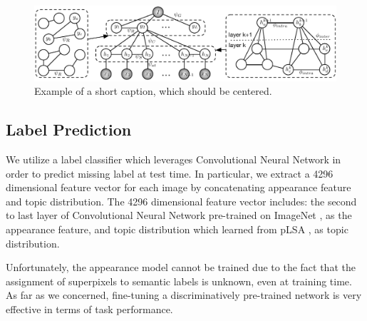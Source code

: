 \begin{figure}
    \begin{center}
        \includegraphics[width=0.95\linewidth]{graphmodel.pdf}
    \end{center}
    \caption{Example of a short caption, which should be centered.}
    \label{fig:graphmodel}
\end{figure}

\subsection{Label Prediction}
We utilize a label classifier which leverages Convolutional Neural Network in order to predict missing label at test time. In particular, we extract a 4296 dimensional feature vector for each image by concatenating appearance feature and topic distribution. The 4296 dimensional feature vector includes: the second to last layer of Convolutional Neural Network pre-trained on ImageNet \cite{deng2009imagenet}, as the appearance feature, and topic distribution which learned from pLSA \cite{hofmann1999probabilistic}, as topic distribution.

Unfortunately, the appearance model cannot be trained due to the fact that the assignment of superpixels to semantic labels is unknown, even at training time. As far as we concerned, fine-tuning a discriminatively pre-trained network is very effective in terms of task performance. 

